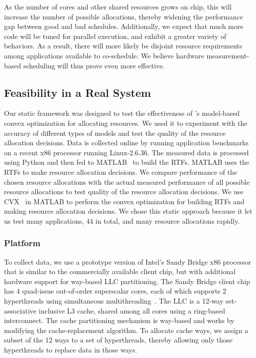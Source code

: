 As the number of cores and other shared resources grows on chip, this
will increase the number of possible allocations, thereby widening the
performance gap between good and bad schedules.  Additionally, we
expect that much more code will be tuned for parallel execution, and
exhibit a greater variety of behaviors.  As a result, there will more
likely be disjoint resource requirements among applications available
to co-schedule.  We believe hardware measurement-based scheduling will
thus prove even more effective.


\subsection{\pacora Feasibility in a Real System}
Our static framework was designed to test the effectiveness of \pacora's model-based convex optimization for allocating resources.  We used it to experiment with the accuracy of different types of models and test the quality of the resource allocation decisions. Data is collected online by running application benchmarks on a recent x86 processor running Linux-2.6.36.  The measured data is processed using Python and then fed to MATLAB~\cite{matlab} to build the RTFs.  MATLAB uses the RTFs to make resource allocation decisions.  We compare performance of the chosen resource allocations with the actual measured performance of all possible resource allocations to test quality of the resource allocation decisions. We use CVX~\cite{cvx} in MATLAB to perform the convex optimization for building RTFs and making resource allocation decisions.  We chose this static approach because it let us test many applications, 44 in total, and many resource allocations rapidly.

\subsubsection{Platform}

To collect data, we use a prototype version of Intel's Sandy Bridge x86 processor that is similar to the
commercially available client chip, but with additional hardware
support for way-based LLC partitioning.
The Sandy Bridge client chip has 4 quad-issue out-of-order
superscalar cores, each of which supports 2 hyperthreads using
simultaneous multithreading~\cite{IntelRefManual:2011}.
The LLC is a 12-way
set-associative  inclusive L3 cache, shared among all
cores using a ring-based interconnect.
The cache partitioning mechanism is way-based and works by modifying the
cache-replacement algorithm.  To allocate cache ways, we assign a subset of
the 12 ways to a set of hyperthreads, thereby allowing only those hyperthreads to replace data in those ways.

